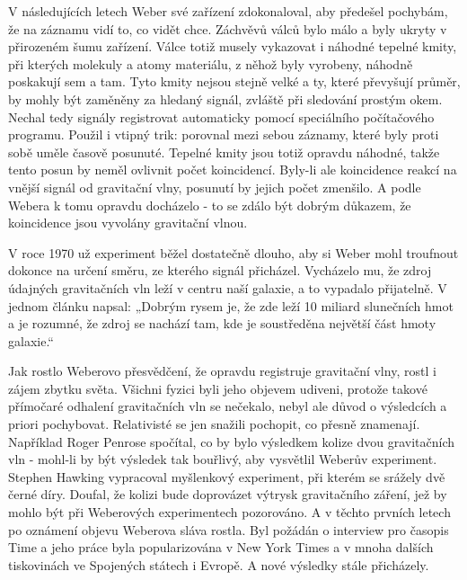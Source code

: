   V následujících letech Weber své zařízení zdokonaloval, aby předešel pochybám, že na záznamu vidí
  to, co vidět chce. Záchvěvů válců bylo málo a byly ukryty v přirozeném šumu zařízení. Válce totiž
  musely vykazovat i náhodné tepelné kmity, při kterých molekuly a atomy materiálu, z něhož byly
  vyrobeny, náhodně poskakují sem a tam. Tyto kmity nejsou stejně velké a ty, které převyšují
  průměr, by mohly být zaměněny za hledaný signál, zvláště při sledování prostým okem. Nechal tedy
  signály registrovat automaticky pomocí speciálního počítačového programu. Použil i vtipný trik:
  porovnal mezi sebou záznamy, které byly proti sobě uměle časově posunuté. Tepelné kmity jsou totiž
  opravdu náhodné, takže tento posun by neměl ovlivnit počet koincidencí. Byly-li ale koincidence
  reakcí na vnější signál od gravitační vlny, posunutí by jejich počet zmenšilo. A podle Webera k
  tomu opravdu docházelo - to se zdálo být dobrým důkazem, že koincidence jsou vyvolány gravitační
  vlnou. 

  V roce 1970 už experiment běžel dostatečně dlouho, aby si Weber mohl troufnout dokonce na určení
  směru, ze kterého signál přicházel. Vycházelo mu, že zdroj údajných gravitačních vln leží v centru
  naší galaxie, a to vypadalo přijatelně. V jednom článku napsal: „Dobrým rysem je, že zde leží 10
  miliard slunečních hmot a je rozumné, že zdroj se nachází tam, kde je soustředěna největší část
  hmoty galaxie.“

  Jak rostlo Weberovo přesvědčení, že opravdu registruje gravitační vlny, rostl i zájem zbytku
  světa. Všichni fyzici byli jeho objevem udiveni, protože takové přímočaré odhalení gravitačních
  vln se nečekalo, nebyl ale důvod o výsledcích a priori pochybovat. Relativisté se jen snažili
  pochopit, co přesně znamenají. Například Roger Penrose spočítal, co by bylo výsledkem kolize dvou
  gravitačních vln - mohl-li by být výsledek tak bouřlivý, aby vysvětlil Weberův experiment. Stephen
  Hawking vypracoval myšlenkový experiment, při kterém se srážely dvě černé díry. Doufal, že kolizi
  bude doprovázet výtrysk gravitačního záření, jež by mohlo být při Weberových experimentech
  pozorováno. A v těchto prvních letech po oznámení objevu Weberova sláva rostla. Byl požádán o
  interview pro časopis Time a jeho práce byla popularizována v New York Times a v mnoha dalších
  tiskovinách ve Spojených státech i Evropě. A nové výsledky stále přicházely.

